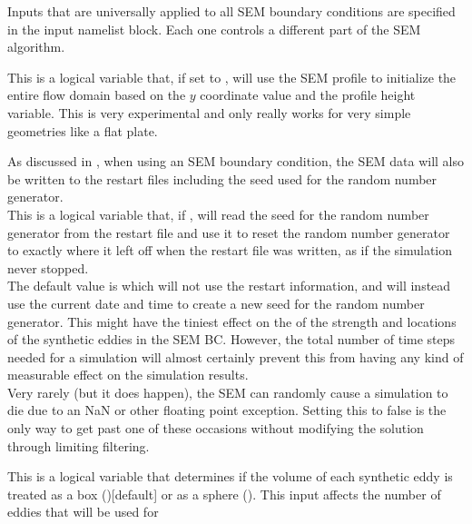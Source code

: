Inputs that are universally applied to all SEM boundary conditions are
specified in the  input namelist block.
Each one controls a different part of the SEM algorithm.
%
\begin{InputList}
%
  \item[{\inp[nmlSEM::UseProfileForInitialization]{Use\_Profile\_For\_Initialization}}]
    This is a logical variable that, if set to \tru, will use the SEM
    profile to initialize the entire flow domain based on the $y$ coordinate
    value and the profile height variable.
    This is very experimental and only really works for very simple geometries
    like a flat plate.
%
  \item[{\inp[nmlSEM::UseRandomSeedFromRestart]{Use\_Random\_Seed\_From\_Restart}}]
    As discussed in , when using an SEM boundary
    condition, the SEM data will also be written to the restart files including
    the seed used for the random number generator.\\[5pt]
    This is a logical variable that, if \tru, will read the seed for
    the random number generator from the restart file and use it to reset the
    random number generator to exactly where it left off when the restart file
    was written, as if the simulation never stopped.\\[5pt]
    The default value is \fls{} which will not use the restart
    information, and will instead use the current date and time to create a new
     seed for the random number generator.
    This might have the tiniest effect on the  of the
    strength and locations of the synthetic eddies in the SEM BC.
    However, the total number of time steps needed for a simulation will almost
    certainly prevent this from having any kind of measurable effect on the
    simulation results.\\[5pt]
    Very rarely (but it does happen), the SEM can randomly cause a simulation to
    die due to an NaN or other floating point exception.
    Setting this to false is the only way to get past one of these occasions
    without modifying the solution through limiting \andor filtering.
%
  \item[{\inp[nmlSEM::UseSphericalEddyVolume]{Use\_Spherical\_Eddy\_Volume}}]
    This is a logical variable that determines if the volume of each synthetic
    eddy is treated as a box (\fls)[default] or as a sphere
    (\tru).
    This input affects the number of eddies that will be used for

\end{InputList}

